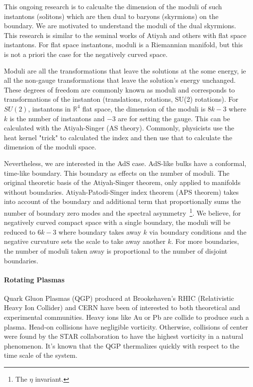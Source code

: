 \documentclass[12pt]{article}
\begin{document}
This ongoing research is to calcualte the dimension of the moduli of such instantons (solitons) which are then dual to baryons (skyrmions) on the boundary.
%
We are motivated to understand the moduli of the dual skyrmions.
%
This research is similar to the seminal works of Atiyah and others with flat space instantons.
%
For flat space instantons, moduli is a Riemannian manifold, but this is not a priori the case for the negatively curved space.

Moduli are all the transformations that leave the solutions at the some energy, ie all the non-gauge transformations that leave the solution's energy unchanged.
%
These degrees of freedom are commonly known as moduli and corresponds to transformations of the instanton (translations, rotations, SU(2) rotations).
%
For $SU(2)$, instantons in $\mathds{R}^4$ flat space, the dimension of the moduli is $8k - 3$ where $k$ is the number of instantons and $-3$ are for setting the gauge.
%
This can be calculated with the Atiyah-Singer (AS theory).
%
Commonly, physicists use the heat kernel "trick" to calculated the index and then use that to calculate the dimension of the moduli space.

Nevertheless, we are interested in the AdS case. 
%
AdS-like bulks have a conformal, time-like boundary.
%
This boundary as effects on the number of moduli.
%
The original theoretic basis of the Atiyah-Singer theorem, only applied to manifolds without boundaries. 
%
Atiyah-Patodi-Singer index theorem (APS theorem) takes into account of the boundary and additional term that proportionally sums the number of boundary zero modes and the spectral asymmetry\
  \footnote{The $\eta$ invariant.}.
We believe, for negatively curved compact space with a single boundary, the moduli will be reduced to $6k - 3$ where boundary takes away $k$ via boundary conditions and the negative curvature sets the scale to take away another $k$.
%
For more boundaries, the number of moduli taken away is proportional to the number of disjoint boundaries.

\paragraph{Rotating Plasmas}

Quark Gluon Plasmas (QGP) produced at Brookehaven's RHIC (Relativistic Heavy Ion Collider) and CERN have been of interested to both theoretical and experimental communities.
%
Heavy ions like Au or Pb are collide to produce such a plasma.
%
Head-on collisions have negligible vorticity.
%
Otherwise, collisions of center were found by the STAR collaboration to have the highest vorticity in a natural phenomenon.
%
It's known that the QGP thermalizes quickly with respect to the time scale of the system.
\end{document}
